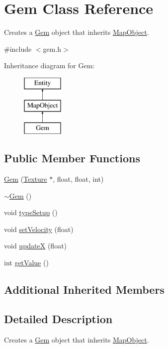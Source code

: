 \hypertarget{class_gem}{\section{Gem Class Reference}
\label{class_gem}
}


Creates a \hyperlink{class_gem}{Gem} object that inherits \hyperlink{class_map_object}{Map\+Object}.  




{\ttfamily \#include $<$gem.\+h$>$}

Inheritance diagram for Gem\+:\begin{figure}[H]
\begin{center}
\leavevmode
\includegraphics[height=3.000000cm]{class_gem}
\end{center}
\end{figure}
\subsection*{Public Member Functions}
\begin{DoxyCompactItemize}
\item 
\hyperlink{class_gem_a9b964b4eacf579f4e9fa2e6006222ca4}{Gem} (\hyperlink{class_texture}{Texture} $\ast$, float, float, int)
\item 
\hyperlink{class_gem_a25c24193733a5c4b9c230e4164b08cd4}{$\sim$\+Gem} ()
\item 
void \hyperlink{class_gem_a5b88637e9b62fc71af306f58f5c82cef}{type\+Setup} ()
\item 
void \hyperlink{class_gem_afb1d9cd03dd88e8d52137d9323f6b808}{set\+Velocity} (float)
\item 
void \hyperlink{class_gem_a5db7f34632d18b938d98136f2d5589b8}{update\+X} (float)
\item 
int \hyperlink{class_gem_acccf14e79a3e6a9db263081e88e953e1}{get\+Value} ()
\end{DoxyCompactItemize}
\subsection*{Additional Inherited Members}


\subsection{Detailed Description}
Creates a \hyperlink{class_gem}{Gem} object that inherits \hyperlink{class_map_object}{Map\+Object}. 

